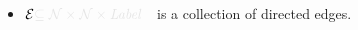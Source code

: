 \documentclass{article}
\newcommand{\notation}[2][]{#1}
\renewcommand{\notation}[2][]{{\color{notationcolor} #2}}
\newcommand{\N}{\mathcal N}
\newcommand{\Ed}{\mathcal E}
\newcommand{\MN}{PDG}
\numberwithin{equation}{section}
\begin{document}
\begin{defn}[\MN]
\begin{itemize}[nosep]
			\item $\Ed \notation{\subseteq \N \times \N \times \mathit{Label}}$~~is a collection of directed edges.

\end{itemize}
\end{defn}
\end{document}
